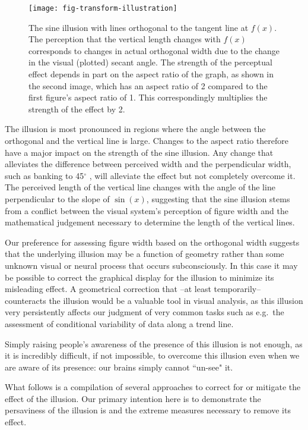 \documentclass[11pt]{isuthesis}\usepackage[]{graphicx}\usepackage[]{color}
\begin{document}
\begin{figure}[h!tbp]
\texttt{[image: fig-transform-illustration]}
\centering
\caption[Geometry of the sine illusion]{\label{fig:OrthogonalWidth} The sine illusion with lines orthogonal to the tangent line at $f(x)$. The perception that the vertical length changes with $f(x)$ corresponds to changes in actual orthogonal width due to the change in the visual (plotted) secant angle. The strength of the perceptual effect depends in part on the aspect ratio of the graph, as shown in the second image, which has an aspect ratio of 2 compared to the first figure's aspect ratio of 1. This correspondingly multiplies the strength of the effect by 2. 
}
\end{figure}
The illusion is most pronounced in regions where the angle between the orthogonal  and the vertical line is large. Changes to the aspect ratio therefore have a major impact on the strength of the sine illusion. Any change that alleviates the difference between perceived width and the perpendicular width, such as banking to 45$^\circ$ \citep{cleveland:88}, will alleviate the effect but not completely overcome it. 
The perceived length of the vertical line changes with the angle of the line perpendicular to the slope of $\sin(x)$, suggesting that the sine illusion stems from a conflict between the visual system's perception of figure width and the mathematical judgement necessary to determine the length of the vertical lines. 



Our preference for assessing figure width based on the orthogonal width suggests that the underlying illusion may be a function of geometry rather than some unknown visual or neural process that occurs subconsciously. In this  case it may be  possible to correct the graphical display for the illusion to minimize its misleading effect. A geometrical correction that  --at least temporarily-- counteracts the illusion would be a valuable tool in visual analysis, as this illusion very persistently affects our judgment of very common tasks  such as e.g.~the assessment of conditional variability of data along a trend line.

Simply raising people's awareness of the presence of this illusion is not enough,
as it is incredibly difficult, if not impossible, to overcome this illusion even when we are aware of its presence: our brains simply cannot ``un-see" it. 

What follows is a compilation of several approaches to correct for or mitigate the effect of the illusion. Our primary intention here is to demonstrate the persaviness of the illusion is and the extreme measures necessary to remove its effect. 
\end{document}
